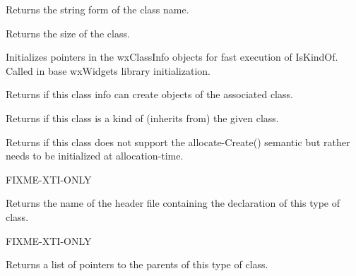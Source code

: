 
Returns the string form of the class name.

\label{wxclassinfogetsize}


Returns the size of the class.

\label{wxclassinfoinitializeclasses}


Initializes pointers in the wxClassInfo objects for fast execution
of IsKindOf. Called in base wxWidgets library initialization.

\label{wxclassinfoisdynamic}


Returns \true if this class info can create objects of the associated class.

\label{wxclassinfoiskindof}


Returns \true if this class is a kind of (inherits from) the given class.



\label{wxclassinfoneedsdirectconstruction}


Returns \true if this class does not support the
allocate-Create() semantic but rather needs to be initialized at allocation-time.

FIXME-XTI-ONLY

\label{wxclassinfogetincludename}


Returns the name of the header file containing the declaration of this type of class.

FIXME-XTI-ONLY


\label{wxclassinfogetparents}


Returns a list of pointers to the parents of this type of class.

